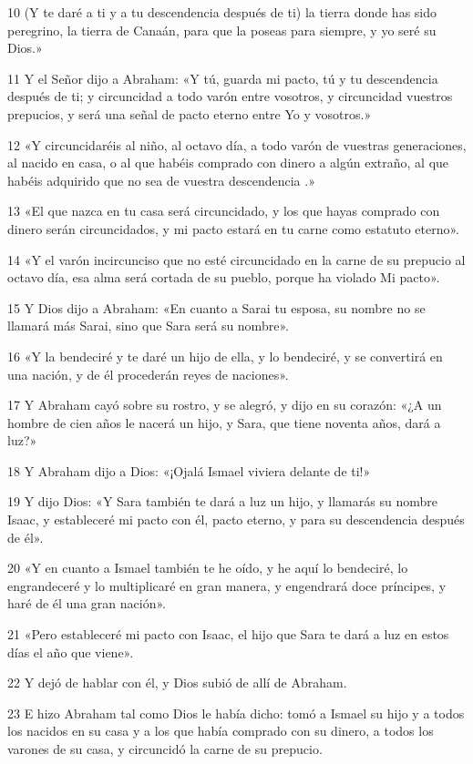 \par 10 (Y te daré a ti y a tu descendencia después de ti) la tierra donde has sido peregrino, la tierra de Canaán, para que la poseas para siempre, y yo seré su Dios.»
\par 11 Y el Señor dijo a Abraham: «Y tú, guarda mi pacto, tú y tu descendencia después de ti; y circuncidad a todo varón entre vosotros, y circuncidad vuestros prepucios, y será una señal de pacto eterno entre Yo y vosotros.»
\par 12 «Y circuncidaréis al niño, al octavo día, a todo varón de vuestras generaciones, al nacido en casa, o al que habéis comprado con dinero a algún extraño, al que habéis adquirido que no sea de vuestra descendencia .»
\par 13 «El que nazca en tu casa será circuncidado, y los que hayas comprado con dinero serán circuncidados, y mi pacto estará en tu carne como estatuto eterno».
\par 14 «Y el varón incircunciso que no esté circuncidado en la carne de su prepucio al octavo día, esa alma será cortada de su pueblo, porque ha violado Mi pacto».
\par 15 Y Dios dijo a Abraham: «En cuanto a Sarai tu esposa, su nombre no se llamará más Sarai, sino que Sara será su nombre».
\par 16 «Y la bendeciré y te daré un hijo de ella, y lo bendeciré, y se convertirá en una nación, y de él procederán reyes de naciones».
\par 17 Y Abraham cayó sobre su rostro, y se alegró, y dijo en su corazón: «¿A un hombre de cien años le nacerá un hijo, y Sara, que tiene noventa años, dará a luz?»
\par 18 Y Abraham dijo a Dios: «¡Ojalá Ismael viviera delante de ti!»
\par 19 Y dijo Dios: «Y Sara también te dará a luz un hijo, y llamarás su nombre Isaac, y estableceré mi pacto con él, pacto eterno, y para su descendencia después de él».
\par 20 «Y en cuanto a Ismael también te he oído, y he aquí lo bendeciré, lo engrandeceré y lo multiplicaré en gran manera, y engendrará doce príncipes, y haré de él una gran nación».
\par 21 «Pero estableceré mi pacto con Isaac, el hijo que Sara te dará a luz en estos días el año que viene».
\par 22 Y dejó de hablar con él, y Dios subió de allí de Abraham.
\par 23 E hizo Abraham tal como Dios le había dicho: tomó a Ismael su hijo y a todos los nacidos en su casa y a los que había comprado con su dinero, a todos los varones de su casa, y circuncidó la carne de su prepucio.

